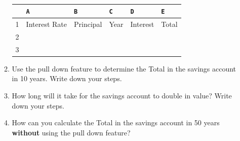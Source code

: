 \documentclass[12pt]{article}
\renewcommand{\emph}[1]{\textsf{\textbf{#1}}}
\begin{document}
\begin{enumerate}
\begin{enumerate}
	{\tt
	\hspace{-1cm}\begin{tabularx}{\textwidth}{|l||X|X|X|X|X|}
	\hline
 & \verb'A' & \verb'B' & \verb'C' & \verb'D' & \verb'E'\\ \hline \hline
	1 & Interest Rate & Principal &  Year & Interest & Total \\ \hline
	2 & & & & &  \\ \hline
	3 & & & & &  \\ \hline 
	\end{tabularx}
	}
	\item Use the pull down feature to determine the Total in the savings account in 10 years. Write down your steps. \\
	\vfill
	\item How long will it take for the savings account to double in value? Write down your steps. \\
	\vfill
	\item How can you calculate the Total in the savings account in 50 years \emph{without} using the pull down feature? 
	

\end{enumerate}
\end{enumerate}
\end{document}
